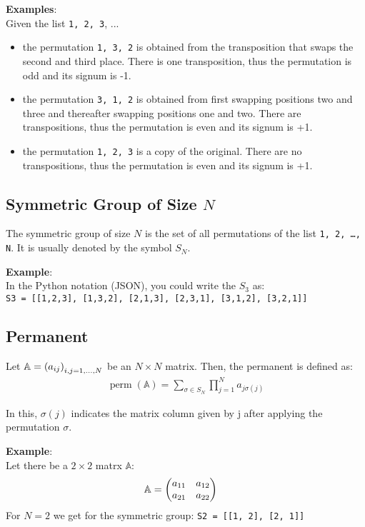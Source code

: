 \documentclass[
	english,
	fontsize=10pt,
	parskip=half,
	titlepage=true,
	DIV=12
]{scrartcl}
\newcommand*{\inPy}[1]{\texttt{#1}}
\DeclareMathOperator{\perm}{perm}
\begin{document}
\newpage
\textbf{Examples}:\\
Given the list \texttt{1, 2, 3}, ...
\begin{itemize}
\item the permutation \texttt{1, 3, 2} is obtained from the transposition that swaps the second and third place.
	There is one transposition, thus the permutation is odd and its signum is -1.
\item the permutation \texttt{3, 1, 2} is obtained from first swapping positions two and three and thereafter swapping positions one and two.
	There are transpositions, thus the permutation is even and its signum is +1.
\item the permutation \texttt{1, 2, 3} is a copy of the original.
	There are no transpositions, thus the permutation is even and its signum is +1.
\end{itemize}

\subsection{Symmetric Group of Size $N$}
The symmetric group of size $N$ is the set of all permutations of the list \texttt{1, 2, \ldots, N}. It is usually denoted by the symbol $S_N$.

\textbf{Example}:\\
In the Python notation (JSON), you could write the $S_3$ as:\\
\inPy{S3 = [[1,2,3], [1,3,2], [2,1,3], [2,3,1], [3,1,2], [3,2,1]]}

\subsection{Permanent}
Let $\mathbb{A} = \qty(a_{ij})_{i, j = 1, ..., N}$ be an $N \times N$ matrix. Then, the permanent is defined as:
\begin{align*}
	\perm(\mathbb{A}) = \sum_{\sigma \in S_N} \prod_{j=1}^N a_{j\sigma(j)}
\end{align*}

In this, $\sigma(j)$ indicates the matrix column given by j after applying the permutation $\sigma$.

\textbf{Example}:\\
Let there be a $2 \times 2$ matrx $\mathbb{A}$:
\begin{align*}
	\mathbb{A}
&=
	\mqty(
		a_{11} & a_{12} \\
		a_{21} & a_{22}
	)
\end{align*}
For $N = 2$ we get for the symmetric group:
\inPy{S2 = [[1, 2], [2, 1]]}
\end{document}
